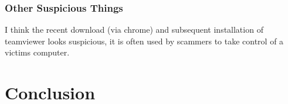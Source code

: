 \documentclass[
	letterpaper, %
	10pt, %
	unnumberedsections, %
	twoside, %
]{APAAssignment}
\begin{document}
\subsubsection{Other Suspicious Things}
I think the recent download (via chrome) and subsequent installation of teamviewer looks suspicious, it is often used by scammers to take control of a victims computer.


\section{Conclusion}





\clearpage
\printbibliography %




%


\clearpage
\end{document}

